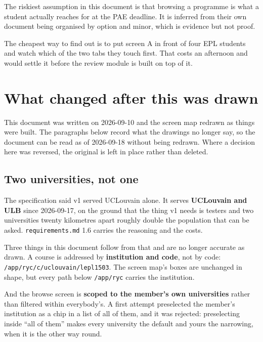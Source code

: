 \documentclass[11pt,a4paper]{article}
\begin{document}
\vfill
\begin{center}
\begin{tcolorbox}[width=0.94\textwidth,colback=studenslt,colframe=studens,
  arc=2pt,fonttitle=\sffamily\bfseries,title={What would make this wrong}]
\sffamily\small
The riskiest assumption in this document is that browsing a programme is what a
student actually reaches for at the PAE deadline. It is inferred from their own
document being organised by option and minor, which is evidence but not proof.

The cheapest way to find out is to put screen A in front of four EPL students
and watch which of the two tabs they touch first. That costs an afternoon and
would settle it before the review module is built on top of it.
\end{tcolorbox}
\end{center}

\newpage
\section{What changed after this was drawn}

This document was written on 2026-09-10 and the screen map redrawn as things
were built. The paragraphs below record what the drawings no longer say, so the
document can be read as of 2026-09-18 without being redrawn. Where a decision
here was reversed, the original is left in place rather than deleted.

\subsection{Two universities, not one}

The specification said v1 served UCLouvain alone. It serves \textbf{UCLouvain
and ULB} since 2026-09-17, on the ground that the thing v1 needs is testers and
two universities twenty kilometres apart roughly double the population that can
be asked. \texttt{requirements.md} 1.6 carries the reasoning and the costs.

Three things in this document follow from that and are no longer accurate as
drawn. A course is addressed by \textbf{institution and code}, not by code:
\texttt{/app/ryc/c/uclouvain/lepl1503}. The screen map's boxes are unchanged in
shape, but every path below \texttt{/app/ryc} carries the institution.

And the browse screen is \textbf{scoped to the member's own universities}
rather than filtered within everybody's. A first attempt preselected the
member's institution as a chip in a list of all of them, and it was rejected:
preselecting inside ``all of them'' makes every university the default and
yours the narrowing, when it is the other way round.
\end{document}
